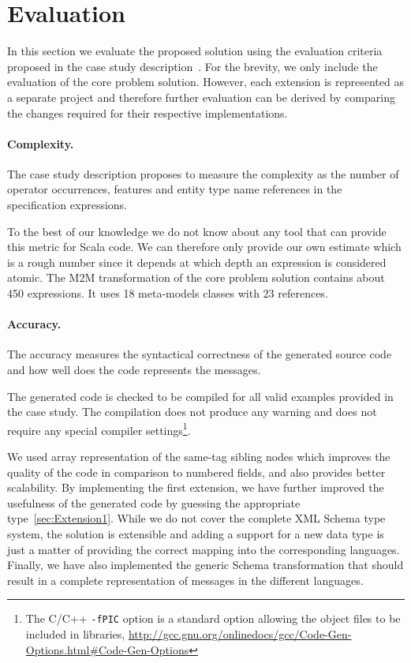
\section{Evaluation}
\label{sec:Evaluation}

In this section we evaluate the proposed solution using the evaluation criteria proposed in the case study description~\cite{Lano2014}.
For the brevity, we only include the evaluation of the core problem solution.
However, each extension is represented as a separate project and therefore further evaluation can be derived by comparing the changes required for their respective implementations.

\paragraph{Complexity.}

The case study description proposes to measure the complexity as the number of operator occurrences, features and entity type name references in the specification expressions.

To the best of our knowledge we do not know about any tool that can provide this metric for Scala code.
We can therefore only provide our own estimate which is a rough number since it depends at which depth an expression is considered atomic.
The M2M transformation of the core problem solution contains about 450 expressions. It uses 18 meta-models classes with 23 references.

\paragraph{Accuracy.}
%
The accuracy measures the syntactical correctness of the generated source code and how well does the code represents the \FIXML messages.

The generated code is checked to be compiled for all valid examples provided in the case study.
The compilation does not produce any warning and does not require any special compiler settings\footnote{The C/C++ \texttt{-fPIC} option is a standard option allowing the object files to be included in libraries, \Cf \url{http://gcc.gnu.org/onlinedocs/gcc/Code-Gen-Options.html\#Code-Gen-Options}}.

We used array representation of the same-tag sibling nodes which improves the quality of the code in comparison to numbered fields, and also provides better scalability.
By implementing the first extension, we have further improved the usefulness of the generated code by guessing the appropriate type~\ref{sec:Extension1}.
While we do not cover the complete XML Schema type system, the solution is extensible and adding a support for a new data type is just a matter of providing the correct mapping into the corresponding languages.
Finally, we have also implemented the generic \FIXML Schema transformation that should result in a complete representation of \FIXML messages in the different languages.

